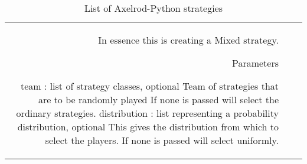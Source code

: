 \begin{table}[!hbtp]
\begin{adjustbox}{width=2\textwidth, angle=90}
\begin{tabular}{rll}
	In essence this is creating a Mixed strategy.

	Parameters

	team : list of strategy classes, optional
	Team of strategies that are to be randomly played
	If none is passed will select the ordinary strategies.
	distribution : list representing a probability distribution, optional
	This gives the distribution from which to select the players.
	If none is passed will select uniformly.                                                                                                                                                                                                                                                                                                                                                                                                                    \\
\end{tabular}
\end{adjustbox}
\caption{List of Axelrod-Python strategies}
\end{table}

